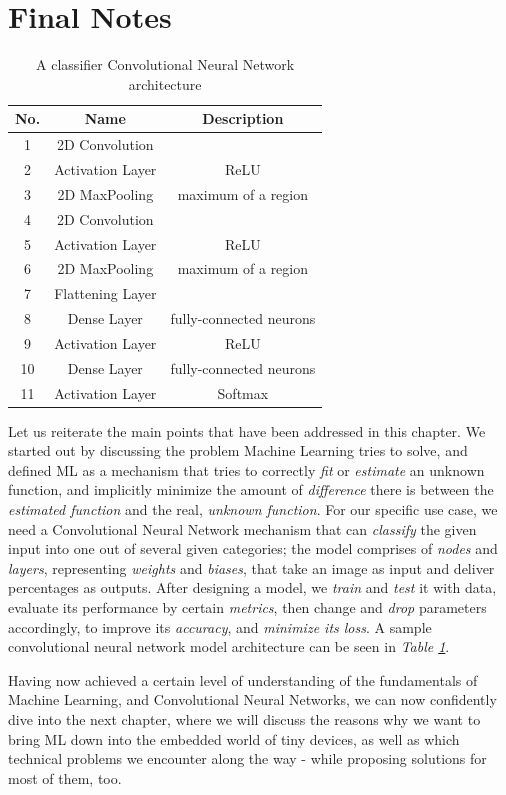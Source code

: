 \section{Final Notes}
\begin{table}[]
    \centering
    \begin{tabular}{|c|c c|}\hline
        No. & \textbf{Name} & Description\\\hline
        1 & 2D Convolution & \\\hline
        2 & Activation Layer & ReLU \\\hline
        3 & 2D MaxPooling & maximum of a region \\\hline
        4 & 2D Convolution & \\\hline
        5 & Activation Layer & ReLU \\\hline
        6 & 2D MaxPooling & maximum of a region \\\hline
        7 & Flattening Layer & \\\hline
        8 & Dense Layer & fully-connected neurons\\\hline
        9 & Activation Layer & ReLU \\\hline
        10 & Dense Layer & fully-connected neurons \\\hline
        11 & Activation Layer & Softmax \\\hline
    \end{tabular}
    \caption{A classifier Convolutional Neural Network architecture}
    \label{tab:sample_net}
\end{table}
Let us reiterate the main points that have been addressed in this chapter. We started out by discussing the problem Machine Learning tries to solve, and defined ML as a mechanism that tries to correctly \textit{fit} or \textit{estimate} an unknown function, and implicitly minimize the amount of \textit{difference} there is between the \textit{estimated function} and the real, \textit{unknown function}. For our specific use case, we need a Convolutional Neural Network mechanism that can \textit{classify} the given input into one out of several given categories; the model comprises of \textit{nodes} and  \textit{layers}, representing \textit{weights} and \textit{biases}, that take an image as input and deliver percentages as outputs. After designing a model, we \textit{train} and \textit{test} it with data, evaluate its performance by certain \textit{metrics}, then change and \textit{drop} parameters accordingly, to improve its \textit{accuracy}, and \textit{minimize its loss}. A sample convolutional neural network model architecture can be seen in \textit{Table \ref{tab:sample_net}}. \par
Having now achieved a certain level of understanding of the fundamentals of Machine Learning, and Convolutional Neural Networks, we can now confidently dive into the next chapter, where we will discuss the reasons why we want to bring ML down into the embedded world of tiny devices, as well as which technical problems we encounter along the way - while proposing solutions for most of them, too. \par
